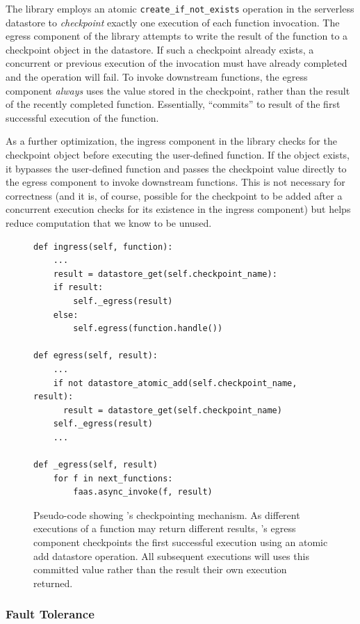 The \name{} library employs an atomic \texttt{create\_if\_not\_exists} operation
in the serverless datastore to \emph{checkpoint} exactly one execution of each
function invocation. The egress component of the \name{} library attempts to
write the result of the function to a checkpoint object in the datastore. If
such a checkpoint already exists, a concurrent or previous execution of the
invocation must have already completed and the operation will fail. To invoke
downstream functions, the egress component \emph{always} uses the value stored
in the checkpoint, rather than the result of the recently completed function.
Essentially, \name{} ``commits'' to result of the first successful execution of
the function.

As a further optimization, the ingress component in the \name{} library checks
for the checkpoint object before executing the user-defined function. If the
object exists, it bypasses the user-defined function and passes the checkpoint
value directly to the egress component to invoke downstream functions. This is
not necessary for correctness (and it is, of course, possible for the checkpoint
to be added after a concurrent execution checks for its existence in the ingress
component) but helps reduce computation that we know to be unused.

\begin{figure}
\begin{verbatim}
def ingress(self, function):
    ...
    result = datastore_get(self.checkpoint_name):
    if result:
        self._egress(result)
    else:
        self.egress(function.handle())

def egress(self, result):
    ...
    if not datastore_atomic_add(self.checkpoint_name, result):
      result = datastore_get(self.checkpoint_name)
    self._egress(result)
    ...

def _egress(self, result)
    for f in next_functions:
        faas.async_invoke(f, result)
\end{verbatim}
\caption{Pseudo-code showing \name{}'s checkpointing mechanism. As different
executions of a function may return different results, \name{}'s egress
component checkpoints the first successful execution using an atomic add
datastore operation. All subsequent executions will uses this committed value
rather than the result their own execution returned.}
\label{fig:design:checkpoint}
\end{figure}

\subsubsection{Fault Tolerance}

